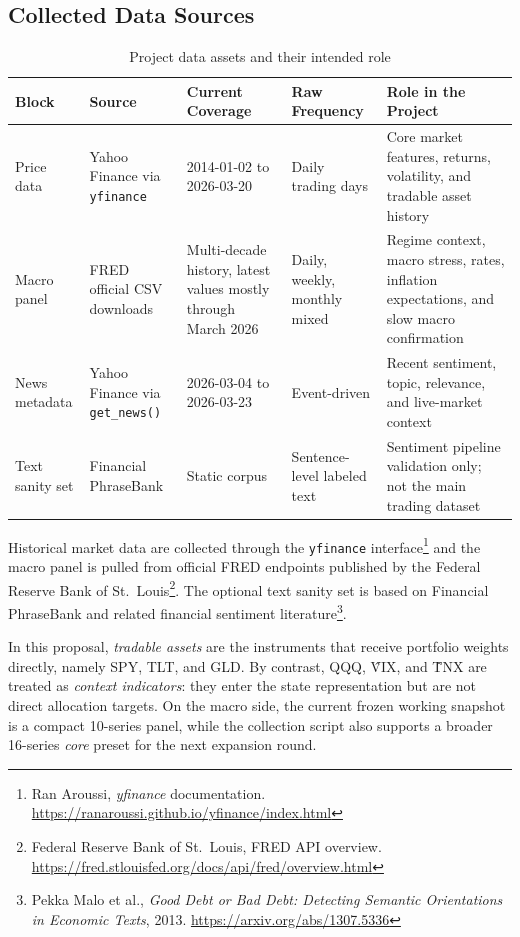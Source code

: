 \documentclass[11pt,a4paper]{article}
\newcommand{\fncite}[2]{\footnote{#1. \url{#2}}}
\begin{document}
\subsection{Collected Data Sources}

\begin{table}[H]
\centering
\caption{Project data assets and their intended role}
\begin{tabularx}{\textwidth}{@{}P{0.16\textwidth}P{0.17\textwidth}P{0.17\textwidth}P{0.12\textwidth}Y@{}}
\toprule
{}
\textbf{Block} & \textbf{Source} & \textbf{Current Coverage} & \textbf{Raw Frequency} & \textbf{Role in the Project} \\
\midrule
Price data & Yahoo Finance via \texttt{yfinance} & 2014-01-02 to 2026-03-20 & Daily trading days & Core market features, returns, volatility, and tradable asset history \\
Macro panel & FRED official CSV downloads & Multi-decade history, latest values mostly through March 2026 & Daily, weekly, monthly mixed & Regime context, macro stress, rates, inflation expectations, and slow macro confirmation \\
News metadata & Yahoo Finance via \texttt{get\_news()} & 2026-03-04 to 2026-03-23 & Event-driven & Recent sentiment, topic, relevance, and live-market context \\
Text sanity set & Financial PhraseBank & Static corpus & Sentence-level labeled text & Sentiment pipeline validation only; not the main trading dataset \\
\bottomrule
\end{tabularx}
\end{table}

Historical market data are collected through the \texttt{yfinance} interface\fncite{Ran Aroussi, \emph{yfinance} documentation}{https://ranaroussi.github.io/yfinance/index.html} and the macro panel is pulled from official FRED endpoints published by the Federal Reserve Bank of St.~Louis\fncite{Federal Reserve Bank of St.~Louis, FRED API overview}{https://fred.stlouisfed.org/docs/api/fred/overview.html}. The optional text sanity set is based on Financial PhraseBank and related financial sentiment literature\fncite{Pekka Malo et al., \emph{Good Debt or Bad Debt: Detecting Semantic Orientations in Economic Texts}, 2013}{https://arxiv.org/abs/1307.5336}.

In this proposal, \emph{tradable assets} are the instruments that receive portfolio weights directly, namely SPY, TLT, and GLD. By contrast, QQQ, \^VIX, and \^TNX are treated as \emph{context indicators}: they enter the state representation but are not direct allocation targets. On the macro side, the current frozen working snapshot is a compact 10-series panel, while the collection script also supports a broader 16-series \emph{core} preset for the next expansion round.
\end{document}

